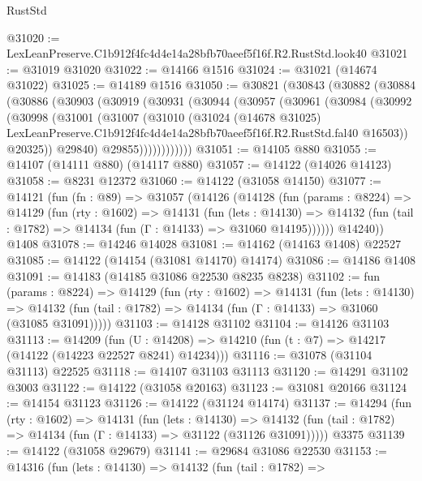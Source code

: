 \begin{lexlean}{RustStd}
\begin{coremodule}
@31020 := LexLeanPreserve.C1b912f4fc4d4e14a28bfb70aeef5f16f.R2.RustStd.look40
@31021 := @31019 @31020
@31022 := @14166 @1516
@31024 := @31021 (@14674 @31022)
@31025 := @14189 @1516
@31050 := @30821
    (@30843
      (@30882
        (@30884
          (@30886
            (@30903
              (@30919
                (@30931
                  (@30944
                    (@30957
                      (@30961
                        (@30984
                          (@30992
                            (@30998
                              (@31001
                                (@31007
                                  (@31010
                                    (@31024
                                      (@14678 @31025)
                                      LexLeanPreserve.C1b912f4fc4d4e14a28bfb70aeef5f16f.R2.RustStd.fal40
                                      @16503))
                                  @20325))
                              @29840)
                            @29855))))))))))))
@31051 := @14105 @880
@31055 := @14107 (@14111 @880) (@14117 @880)
@31057 := @14122 (@14026 @14123)
@31058 := @8231 @12372
@31060 := @14122 (@31058 @14150)
@31077 := @14121
    (fun (fn : @89) =>
    @31057
      (@14126
        (@14128
          (fun (params : @8224) =>
          @14129
            (fun (rty : @1602) =>
            @14131
              (fun (lets : @14130) =>
              @14132 (fun (tail : @1782) => @14134 (fun (Γ : @14133) => @31060 @14195))))))
        @14240))
    @1408
@31078 := @14246 @14028
@31081 := @14162 (@14163 @1408) @22527
@31085 := @14122 (@14154 (@31081 @14170) @14174)
@31086 := @14186 @1408
@31091 := @14183 (@14185 @31086 @22530 @8235 @8238)
@31102 := fun (params : @8224) =>
  @14129
    (fun (rty : @1602) =>
    @14131
      (fun (lets : @14130) =>
      @14132 (fun (tail : @1782) => @14134 (fun (Γ : @14133) => @31060 (@31085 @31091)))))
@31103 := @14128 @31102
@31104 := @14126 @31103
@31113 := @14209
    (fun (U : @14208) => @14210 (fun (t : @7) => @14217 (@14122 (@14223 @22527 @8241) @14234)))
@31116 := @31078 (@31104 @31113) @22525
@31118 := @14107 @31103 @31113
@31120 := @14291 @31102 @3003
@31122 := @14122 (@31058 @20163)
@31123 := @31081 @20166
@31124 := @14154 @31123
@31126 := @14122 (@31124 @14174)
@31137 := @14294
    (fun (rty : @1602) =>
    @14131
      (fun (lets : @14130) =>
      @14132 (fun (tail : @1782) => @14134 (fun (Γ : @14133) => @31122 (@31126 @31091)))))
    @3375
@31139 := @14122 (@31058 @29679)
@31141 := @29684 @31086 @22530
@31153 := @14316
    (fun (lets : @14130) =>
    @14132
      (fun (tail : @1782) =>

\end{coremodule}
\end{lexlean}
